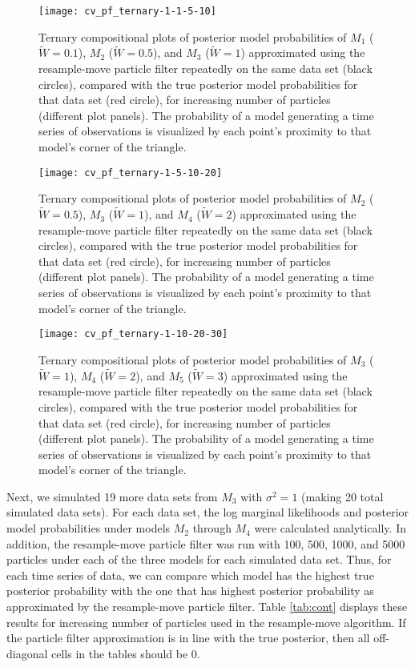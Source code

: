 \documentclass{article}
\begin{document}
\begin{figure}
\texttt{[image: cv\_pf\_ternary-1-1-5-10]}
\caption{Ternary compositional plots of posterior model probabilities of $M_1$ ($\tilde{W} = 0.1$), $M_2$ ($\tilde{W} = 0.5$), and $M_3$ ($\tilde{W} = 1$) approximated using the resample-move particle filter repeatedly on the same data set (black circles), compared with the true posterior model probabilities for that data set (red circle), for increasing number of particles (different plot panels). The probability of a model generating a time series of observations is visualized by each point's proximity to that model's corner of the triangle.} \label{fig:pf-1sim-ternary1}
\end{figure}

\begin{figure}
\texttt{[image: cv\_pf\_ternary-1-5-10-20]}
\caption{Ternary compositional plots of posterior model probabilities of $M_2$ ($\tilde{W} = 0.5$), $M_3$ ($\tilde{W} = 1$), and $M_4$ ($\tilde{W} = 2$) approximated using the resample-move particle filter repeatedly on the same data set (black circles), compared with the true posterior model probabilities for that data set (red circle), for increasing number of particles (different plot panels). The probability of a model generating a time series of observations is visualized by each point's proximity to that model's corner of the triangle.} \label{fig:pf-1sim-ternary2}
\end{figure}

\begin{figure}
\texttt{[image: cv\_pf\_ternary-1-10-20-30]}
\caption{Ternary compositional plots of posterior model probabilities of $M_3$ ($\tilde{W} = 1$), $M_4$ ($\tilde{W} = 2$), and $M_5$ ($\tilde{W} = 3$) approximated using the resample-move particle filter repeatedly on the same data set (black circles), compared with the true posterior model probabilities for that data set (red circle), for increasing number of particles (different plot panels). The probability of a model generating a time series of observations is visualized by each point's proximity to that model's corner of the triangle.} \label{fig:pf-1sim-ternary3}
\end{figure}

Next, we simulated 19 more data sets from $M_3$ with $\sigma^2 = 1$ (making 20 total simulated data sets). For each data set, the log marginal likelihoods and posterior model probabilities under models $M_2$ through $M_4$ were calculated analytically. In addition, the resample-move particle filter was run with 100, 500, 1000, and 5000 particles under each of the three models for each simulated data set. Thus, for each time series of data, we can compare which model has the highest true posterior probability with the one that has highest posterior probability as approximated by the resample-move particle filter. Table \ref{tab:cont} displays these results for increasing number of particles used in the resample-move algorithm. If the particle filter approximation is in line with the true posterior, then all off-diagonal cells in the tables should be 0.
\end{document}
